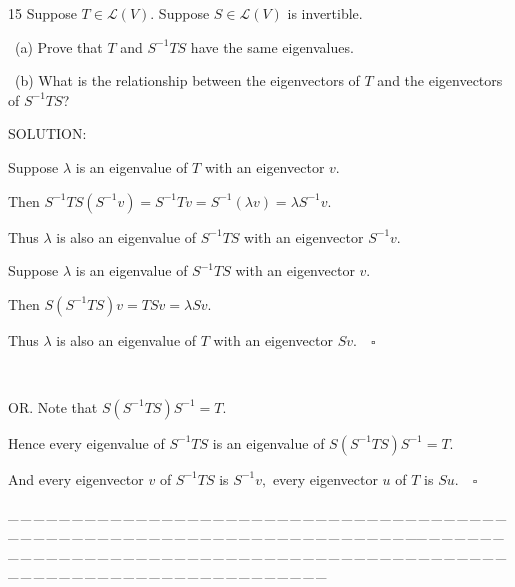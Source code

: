 \documentclass[a4paper, 11pt, UTF8]{article}
\def\Lm{\mathcal{L}}
\begin{document}
\begin{large}
{\timesbf\Large 15} {\timessl\Large 
Suppose $T\in\Lm(V)$. Suppose $S\in\Lm(V)$ is invertible.}\par\quad\,
(a) {\timessl\Large Prove that $T$ and $S^{-1}TS$ have the same eigenvalues.}\par\quad\,
(b) {\timessl\Large What is the relationship between the eigenvectors of $T$ and the eigenvectors of $S^{-1}TS$?
}\par
{\timesbf S\footnotesize{OLUTION:}}\par\quad
Suppose $\lambda$ is an eigenvalue of $T$ with an eigenvector $v$.\par\quad
Then $S^{-1}TS(S^{-1}v)=S^{-1}Tv=S^{-1}(\lambda v)=\lambda S^{-1}v.$\par\quad
Thus $\lambda$ is also an eigenvalue of $S^{-1}TS$ with an eigenvector $S^{-1}v$.\par\quad
Suppose $\lambda$ is an eigenvalue of $S^{-1}TS$ with an eigenvector $v.$\par\quad
Then $S(S^{-1}TS)v=TSv=\lambda Sv.$\par\quad
Thus $\lambda$ is also an eigenvalue of $T$ with an eigenvector $Sv.\quad\square$\par{\tiny\,\par}\quad
O{\small R.} Note that $S(S^{-1}TS)S^{-1}=T.$\par\quad Hence every eigenvalue of $S^{-1}TS$ is an eigenvalue of $S(S^{-1}TS)S^{-1}=T.$\par\quad
{\normalsize And every eigenvector $v$ of $S^{-1}TS$ is $S^{-1}v,$ every eigenvector $u$ of $T$ is $Su.$}$\quad\square$\par
\par
{\tiny \_\,\_\,\_\,\_\,\_\,\_\,\_\,\_\,\_\,\_\,\_\,\_\,\_\,\_\,\_\,\_\,\_\,\_\,\_\,\_\,\_\,\_\,\_\,\_\,\_\,\_\,\_\,\_\,\_\,\_\,\_\,\_\,\_\,\_\,\_\,\_\,\_\,\_\,\_\,\_\,\_\,\_\,\_\,\_\,\_\,\_\,\_\,\_\,\_\,\_\,\_\,\_\,\_\,\_\,\_\,\_\,\_\,\_\,\_\,\_\,\_\,\_\,\_\,\_\,\_\,\_\,\_\,\_\,\_\,\_\,\_\_\,\_\,\_\,\_\,\_\,\_\,\_\,\_\,\_\,\_\,\_\,\_\,\_\,\_\,\_\,\_\,\_\,\_\,\_\,\_\,\_\,\_\,\_\,\_\,\_\,\_\,\_\,\_\,\_\,\_\,\_\,\_\,\_\,\_\,\_\,\_\,\_\,\_\,\_\,\_\,\_\,\_\,\_\,\_\,\_\,\_\,\_\,\_\,\_\,\_\,\_\,\_\,\_\,\_\,\_\,\_\,\_\,\_\,\_\,\_\,\_\,\_\,\_\,\_\,\_\,\_\,\_\,\_\,\_\,\_\,\_}\par


\end{large}
\end{document}
